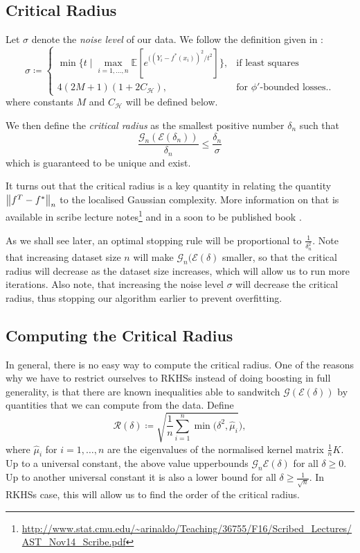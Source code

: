 \subsection{Critical Radius}

Let $\sigma$ denote the \textit{noise level} of our data. We follow the definition
given in \citet{wei2017early}:
$$
\sigma \coloneqq
\begin{cases}
  \min\{t \mid \underset{i = 1, \dots, n}{\max} \mathbb{E}[e^{((Y_{i} - f^{*}(x_{i}))^{2}/t^{2}}] \}, & \text{if least squares} \\
  4(2M + 1)(1 + 2C_{\mathcal{H}}), & \text{for } \phi'\text{-bounded losses.}.
\end{cases}
$$
where constants $M$ and $C_{\mathcal{H}}$ will be defined below.

We then define the \textit{critical radius} as the smallest positive number $\delta_{n}$ such that
\begin{equation*}
  \frac{\mathcal{G}_n(\mathcal{E}(\delta_{n}))}{\delta_n} \le \frac{\delta_{n}}{\sigma}
\end{equation*}
which is guaranteed to be unique and exist.

It turns out that the critical radius is a key quantity in relating the quantity
$\left\lVert f^{T} - f^{*}\right\rVert_{n}$ to the localised Gaussian complexity.
More information on that is available in scribe lecture notes\footnote{\url{http://www.stat.cmu.edu/~arinaldo/Teaching/36755/F16/Scribed_Lectures/AST_Nov14_Scribe.pdf}} and in a soon to
be published book \citet{wainwright2017high}.

As we shall see later, an optimal stopping rule will be proportional to $\frac{1}{\delta_{n}^{2}}$.
Note that increasing dataset size $n$ will make $\mathcal{G}_{n}(\mathcal{E}(\delta)$ smaller,
so that the critical radius will decrease as the dataset size increases, which will
allow us to run more iterations. Also note, that increasing the noise level $\sigma$
will decrease the critical radius, thus stopping our algorithm earlier to prevent
overfitting.

\subsection{Computing the Critical Radius}

In general, there is no easy way to compute the critical radius.
One of the reasons why we have to restrict ourselves to RKHSs instead of doing
boosting in full generality, is that there are known inequalities able to sandwitch
$\mathcal{G}(\mathcal{E}(\delta))$ by quantities that we can compute from the data.
Define
$$
\mathcal{R}(\delta) \coloneqq \sqrt{\frac{1}{n} \sum_{i=1}^{n} \min(\delta^{2}, \hat{\mu}_{i}}),
$$
where $\hat{\mu}_{i}$ for $i = 1, \dots, n$ are the eigenvalues of the normalised
kernel matrix $\frac{1}{n}K$.
Up to a universal constant, the above value upperbounds $\mathcal{G}_{n}{\mathcal{E}(\delta)}$
for all $\delta \geq 0$. Up to another universal constant it is also a lower bound for all
$\delta \geq \frac{1}{\sqrt{n}}$. In RKHSs case, this will allow us to find the order
of the critical radius.


